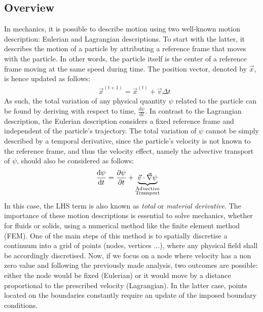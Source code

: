 \subsection{Overview}
In mechanics, it is possible to describe motion using two well-known motion description: Eulerian and Lagrangian descriptions.
To start with the latter, it describes the motion of a particle by attributing a reference frame that moves with the particle.
In other words, the particle itself is the center of a reference frame moving at the same speed during time. 
The position vector, denoted by $\vec{x}$, is hence updated as follows:
\begin{align}
\label{eq:lagrangian}
& \vec{x}^{(t+1)}  = \vec{x}^{(t)} + \vec{v} \Delta t
\end{align}
As such, the total variation of any physical quantity $\psi$ related to the particle 
can be found by deriving with respect to time, $\frac{\mathrm{d} \psi}{\mathrm{d} t}$.
%
In contrast to the Lagrangian description, the Eulerian description considers a 
fixed reference frame and independent of the particle's trajectory. The total variation of $\psi$
cannot be simply described by a temporal derivative, since the particle's velocity is not known to 
the reference frame, and thus the velocity effect, namely the advective transport of $\psi$, should also be considered as follows:
\begin{align}
\label{eq:eulerian}
& \frac{\mathrm{d} \psi}{\mathrm{d} t} = \frac{\partial \psi}{\partial t} 
   + \underbrace{\vec{v} \cdot \vec{\nabla} \psi}_{\substack{\text{Advective} \\ \text{Transport}}}  
\end{align}
In this case, the LHS term is also known as \emph{total} or \emph{material derivative}.
The importance of these motion descriptions is essential to solve mechanics, whether for 
fluids or solids, using a numerical method like the finite element method (FEM). One of 
the main steps of this method is to spatially discretise a continuum into a grid of points 
(nodes, vertices ...), where any physical field shall be accordingly discretised. Now, if 
we focus on a node where velocity has a non zero value and following the previously made 
analysis, two outcomes are possible: either the node would be fixed (Eulerian) or it would 
move by a distance proportional to the prescribed velocity (Lagrangian). In the latter case,
points located on the boundaries constantly require an update of the imposed boundary conditions.


